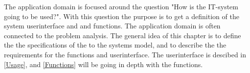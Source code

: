 The application domain is focused around the question "How is the IT-system going to be used?".
With this question the purpose is to get a definition of the system userinterface and and functions.
The application domain is often connected to the problem analysis. The general idea of this chapter is to define the the specifications of the to the systems model, and to describe the the requirements for the functions and userinterface.
The userinterface is descibed in \cref{Usage}, and \cref{Functions} will be going in depth with the functions.

